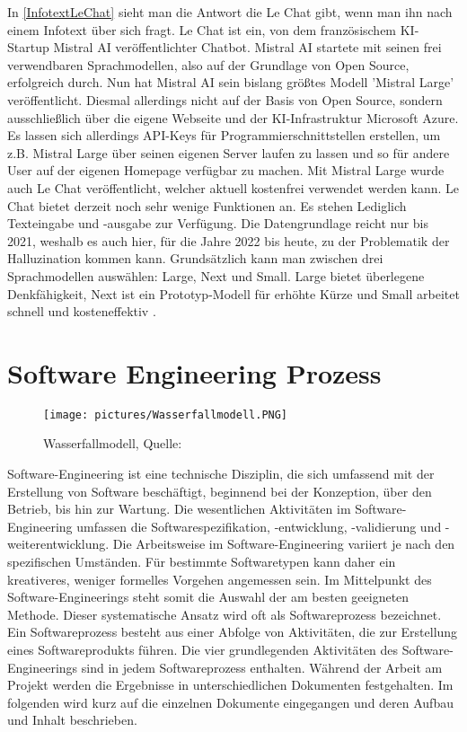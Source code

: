 In \autoref{InfotextLeChat} sieht man die Antwort die Le Chat gibt, wenn man ihn nach einem Infotext über sich 
fragt. Le Chat ist ein, von dem französischem KI-Startup Mistral AI veröffentlichter Chatbot. Mistral AI startete mit  
seinen frei verwendbaren Sprachmodellen, also auf der Grundlage von Open Source, erfolgreich durch. Nun  
hat Mistral AI sein bislang größtes Modell 'Mistral Large' veröffentlicht. Diesmal allerdings nicht auf der  
Basis von Open Source, sondern ausschließlich über die eigene Webseite und der KI-Infrastruktur Microsoft  
Azure. Es lassen sich allerdings API-Keys für Programmierschnittstellen erstellen, um z.B. Mistral Large über  
seinen eigenen Server laufen zu lassen und so für andere User auf der eigenen Homepage verfügbar zu machen.  
Mit Mistral Large wurde auch Le Chat veröffentlicht, welcher aktuell kostenfrei verwendet werden kann.
Le Chat bietet derzeit noch sehr wenige Funktionen an. Es stehen Lediglich Texteingabe und -ausgabe zur Verfügung.  
Die Datengrundlage reicht nur bis 2021, weshalb es auch hier, für die Jahre 2022 bis heute, zu der Problematik der  
Halluzination kommen kann.
Grundsätzlich kann man zwischen drei Sprachmodellen auswählen: Large, Next und Small. Large bietet überlegene Denkfähigkeit,  
Next ist ein Prototyp-Modell für erhöhte Kürze und Small arbeitet schnell und kosteneffektiv \cite{GrundlagenLeChat}.


\section{Software Engineering Prozess}

\begin{figure}
    \centering
    \texttt{[image: pictures/Wasserfallmodell.PNG]}
    \caption{Wasserfallmodell, Quelle: \cite{Sommerville10}}
    \label{Ablauf Wasserfallmodell}
\end{figure}

Software-Engineering ist eine technische Disziplin, die sich umfassend mit der Erstellung von Software beschäftigt, beginnend 
bei der Konzeption, über den Betrieb, bis hin zur Wartung. Die wesentlichen Aktivitäten im Software-Engineering umfassen die 
Softwarespezifikation, -entwicklung, -validierung und -weiterentwicklung. Die Arbeitsweise im Software-Engineering variiert 
je nach den spezifischen Umständen. Für bestimmte Softwaretypen kann daher ein kreativeres, weniger formelles Vorgehen angemessen 
sein. Im Mittelpunkt des Software-Engineerings steht somit die Auswahl der am besten geeigneten Methode. Dieser systematische 
Ansatz wird oft als Softwareprozess bezeichnet. Ein Softwareprozess besteht aus einer Abfolge von Aktivitäten, die zur Erstellung 
eines Softwareprodukts führen. Die vier grundlegenden Aktivitäten des Software-Engineerings sind in jedem Softwareprozess 
enthalten. Während der Arbeit am Projekt werden die Ergebnisse in unterschiedlichen Dokumenten festgehalten. Im folgenden 
wird kurz auf die einzelnen Dokumente eingegangen und deren Aufbau und Inhalt beschrieben.\\ 

